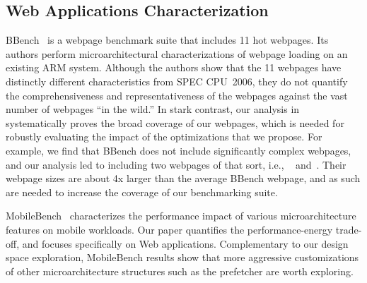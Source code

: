 \subsection{Web Applications Characterization}
\label{sec:arch:related:char}

BBench~\cite{BBench} is a webpage benchmark suite that includes 11 hot webpages. Its authors perform microarchitectural characterizations of webpage loading on an existing ARM system. Although the authors show that the 11 webpages have distinctly different characteristics from SPEC CPU~2006, they do not quantify the comprehensiveness and representativeness of the webpages against the vast number of webpages ``in the wild.'' In stark contrast, our analysis in~ systematically proves the broad coverage of our webpages, which is needed for robustly evaluating the impact of the optimizations that we propose. For example, we find that BBench does not include significantly complex webpages, and our analysis led to including two webpages of that sort, i.e., ~ and~. Their webpage sizes are about 4x larger than the average BBench webpage, and as such are needed to increase the coverage of our benchmarking suite.

MobileBench~\cite{MobileBench} characterizes the performance impact of various microarchitecture features on mobile workloads. Our paper quantifies the performance-energy trade-off, and focuses specifically on Web applications. Complementary to our design space exploration, MobileBench results show that more aggressive customizations of other microarchitecture structures such as the prefetcher are worth exploring.
